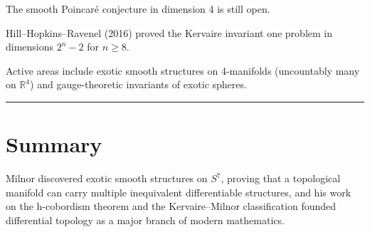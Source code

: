 The smooth Poincaré conjecture in dimension 4 is still open.

Hill--Hopkins--Ravenel (2016) proved the Kervaire invariant one problem in
dimensions $2^n - 2$ for $n \geq 8$.

Active areas include exotic smooth structures on 4-manifolds (uncountably many on
$\mathbb{R}^4$) and gauge-theoretic invariants of exotic spheres.

\begin{center}\rule{0.5\linewidth}{0.5pt}\end{center}

\section*{Summary}

Milnor discovered exotic smooth structures on $S^7$, proving that a topological
manifold can carry multiple inequivalent differentiable structures, and his work
on the h-cobordism theorem and the Kervaire--Milnor classification founded
differential topology as a major branch of modern mathematics.
